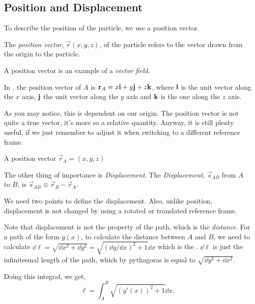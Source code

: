 \subsection{Position and Displacement}

To describe the position of the particle, we use a position vector. 
\begin{definition}
    The \emph{position vector}, $\vec{r}(x, y, z)$, of the particle refers to the vector drawn from the origin to the particle.
\end{definition}
A position vector is an example of a \emph{vector field}.

In , the position vector of $A$ is $\mathbf{\boldsymbol{r}}_A = x\mathbf{\boldsymbol{i}} + y\mathbf{\boldsymbol{j}} + z\mathbf{\boldsymbol{k}}$, where 
$\mathbf{\boldsymbol{i}}$ is the unit vector along the $x$ axis, $\mathbf{\boldsymbol{j}}$ the unit vector along the $y$ axis and $\mathbf{\boldsymbol{k}}$ is 
the one along the $z$ axis.

As you may notice, this is dependent on our origin. The position vector is not quite
a true vector, it's more so a relative quantity. Anyway, it is still plenty useful,
if we just remember to adjust it when switching to a different reference frame.

\begin{marginfigure}
    \hspace{-1.2em}
    \caption{A position vector $\vec{r}_A = (x, y, z)$} 
    \label{fig: position}
\end{marginfigure}

The other thing of importance is \emph{Displacement}. 
The  \emph{Displacement}, $\vec{s}_{AB}$ from $A$ to $B$, is $\vec{s}_{AB} \equiv \vec{r}_B - \vec{r}_A$.

We need two points to define the displacement. Also, unlike position, displacement 
is not changed by using a rotated or translated reference frame. 

Note that displacement is not the property of the path, which is the \emph{distance}. For a path 
of the form $y(x)$, to calculate the distance between $A$ and $B$, we need to calculate $\dd{\ell} = 
\sqrt{\dd{x}^2 + \dd{y}^2} = \sqrt{(\dd{y}/\dd{x})^2 + 1}\dd{x}$ which is the .
$\dd{\ell}$ is just the infinitesmal length of the path, which by pythagoras is equal to $\sqrt{\dd{y}^2 + \dd{x}^2}$.  

Doing this integral, we get,
\begin{equation}
    \ell = \int_A^B \sqrt{(y'(x))^2 + 1} \dd{x}.
\end{equation}

